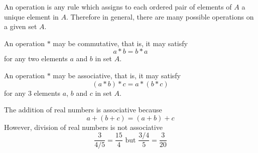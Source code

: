 \documentclass[12pt]{article}
\renewcommand{\times}{\ast}
\begin{document}
An operation is any rule which assigns to each ordered pair of elements of $A$ a unique element in $A$. Therefore in general, there are many possible operations on a given set $A$. 


\begin{definition} An operation $\times$ may be commutative, that is, it may satisfy $$ a \times b = b \times a$$ for any two elements $a$ and $b$ in set $A$. \end{definition}

\begin{definition} An operation $\times$ may be associative, that is, it may satisfy $$ (a \times b) \times c = a \times (b \times c) $$ for any 3 elements $a$, $b$ and $c$ in set $A$. \end{definition} 

\begin{example} The addition of real numbers is associative because $$a + (b + c) = (a + b) + c$$
However, division of real numbers is not associative $$ \frac{3}{4/5} = \frac{15}{4} \text{ but } \frac{3/4}{5} = \frac{3}{20} $$ \end{example} 
\end{document}

